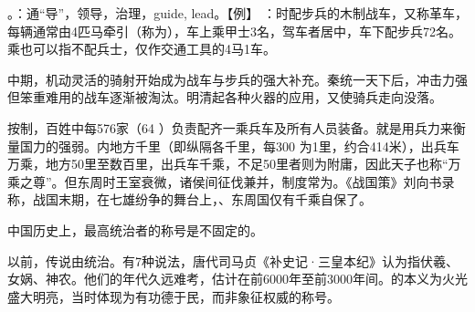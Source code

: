 {
\item {}。：通“导”，领导，治理，guide, lead。【例】 ：时配步兵的木制战车，又称革车，每辆通常由4匹马牵引（称为），车上乘甲士3名，驾车者居中，车下配步兵72名。乘也可以指不配兵士，仅作交通工具的4马1车。

中期，机动灵活的骑射开始成为战车与步兵的强大补充。秦统一天下后，冲击力强但笨重难用的战车逐渐被淘汰。明清起各种火器的应用，又使骑兵走向没落。

按制，百姓中每576家（64 ）负责配齐一乘兵车及所有人员装备。就是用兵力来衡量国力的强弱。内地方千里（即纵隔各千里，每300 为1里，约合414米），出兵车万乘，地方50里至数百里，出兵车千乘，不足50里者则为附庸，因此天子也称“万乘之尊”。但东周时王室衰微，诸侯间征伐兼并，制度常为。《战国策》刘向书录称，战国末期，在七雄纷争的舞台上，、东周国仅有千乘自保了。

中国历史上，最高统治者的称号是不固定的。

\begin{lyenumerate}
\item {}以前，传说由统治。有7种说法，唐代司马贞《补史记·三皇本纪》认为指伏羲、女娲、神农。他们的年代久远难考，估计在前6000年至前3000年间。的本义为火光盛大明亮，当时体现为有功德于民，而非象征权威的称号。


\end{lyenumerate}}
